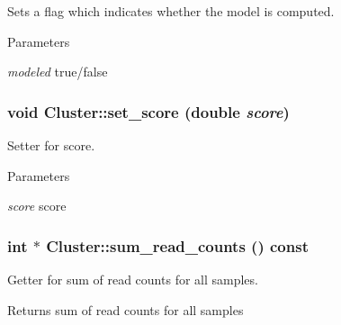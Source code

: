 Sets a flag which indicates whether the model is computed. 
\begin{DoxyParams}{Parameters}
\item[{\em modeled}]true/false \end{DoxyParams}
\hypertarget{classCluster_a8781c74a1383267f2b32fc9a74409356}{
\subsubsection[{set\_\-score}]{\setlength{\rightskip}{0pt plus 5cm}void Cluster::set\_\-score (double {\em score})}}
\label{classCluster_a8781c74a1383267f2b32fc9a74409356}


Setter for score. 
\begin{DoxyParams}{Parameters}
\item[{\em score}]score \end{DoxyParams}
\hypertarget{classCluster_aa8f85d4337bb6457d38d68f0cb696e5b}{
\subsubsection[{sum\_\-read\_\-counts}]{\setlength{\rightskip}{0pt plus 5cm}int $\ast$ Cluster::sum\_\-read\_\-counts () const}}
\label{classCluster_aa8f85d4337bb6457d38d68f0cb696e5b}


Getter for sum of read counts for all samples. \begin{DoxyReturn}{Returns}
sum of read counts for all samples 
\end{DoxyReturn}


